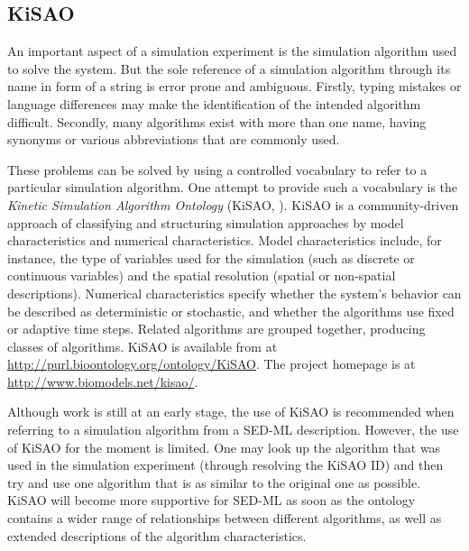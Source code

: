 \subsection{KiSAO}
\label{sec:kisao}

An important aspect of a simulation experiment is the simulation algorithm used to solve the system.
But the sole reference of a simulation algorithm through its name in form of a string is error prone and ambiguous. Firstly, typing mistakes or language differences may make the identification of the intended algorithm difficult. Secondly, many algorithms exist with more than one name, having synonyms or various abbreviations that are commonly used.

These problems can be solved by using a controlled vocabulary to refer to a particular simulation algorithm. One attempt to provide such a vocabulary is the \emph{Kinetic Simulation Algorithm Ontology} (KiSAO, \citep{CWK+10}). KiSAO is a community-driven approach of classifying and structuring simulation approaches by model characteristics and numerical characteristics.  Model characteristics include, for instance, the type of variables used for the simulation (such as discrete or continuous variables) and the spatial resolution (spatial or non-spatial descriptions). Numerical characteristics specify whether the system's behavior can be described as deterministic or stochastic, and whether the algorithms use fixed or adaptive time steps.  
Related algorithms are grouped together, producing classes of algorithms.
KiSAO is available from  at \url{http://purl.bioontology.org/ontology/KiSAO}. The project homepage is at \url{http://www.biomodels.net/kisao/}.
%
%

Although work is still at an early stage, the use of KiSAO is recommended when referring to a simulation algorithm from a SED-ML description. However, the use of KiSAO for the moment is limited. One may look up the algorithm that was used in the simulation experiment (through resolving the KiSAO ID) and then try and use one algorithm that is as similar to the original one as possible. KiSAO will become more supportive for SED-ML as soon as the ontology contains a wider range of relationships between different algorithms, as well as extended descriptions of the algorithm characteristics.



